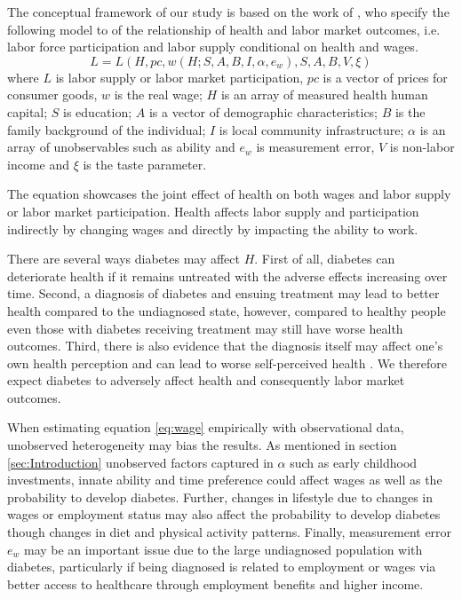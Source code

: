 \documentclass[12pt,english,british]{article}
\begin{document}
  
The conceptual framework of our study is based on the work of \citet{Strauss1998},  who specify the following model to of the relationship of health and labor market outcomes, i.e. labor force participation and labor supply conditional on health and wages.
\begin{equation}
L=L(H, pc, w(H;S,A,B,I,\alpha,e_{w}), S, A, B, V, \xi) \label{eq:wage}
\end{equation}
where $L$ is labor supply or labor market participation, $pc$ is a vector of prices for consumer goods, $w$ is the real wage; $H$ is an array of measured health human capital; $S$ is education; $A$ is a vector of demographic characteristics; $B$ is the family background of the individual; $I$ is local community infrastructure; $\alpha$ is an array of unobservables such as ability and $e_w$ is measurement error, $V$ is non-labor income and $\xi$ is the taste parameter. 

The equation showcases the joint effect of health on both wages and labor supply or labor market participation. Health affects labor supply and participation indirectly by changing wages and directly by impacting the ability to work.

There are several ways diabetes may affect $H$. First of all, diabetes can deteriorate health if it remains untreated with the adverse effects increasing over time. Second, a diagnosis of diabetes and ensuing treatment may lead to better health compared to the undiagnosed state, however, compared to healthy people even those with diabetes receiving treatment may still have worse health outcomes. Third, there is also evidence that the diagnosis itself may affect one's own health perception and can lead to worse self-perceived health \citep{Thoolen2006a}. We therefore expect diabetes to adversely affect health and consequently labor market outcomes.

When estimating equation  \ref{eq:wage} empirically with observational data, unobserved heterogeneity may bias the results. As mentioned in section  \ref{sec:Introduction} unobserved factors captured in $\alpha$ such as early childhood investments, innate ability and time preference could affect wages as well as the probability to develop diabetes. Further, changes in lifestyle due to changes in wages or employment status may also affect the probability to develop diabetes though changes in diet and physical activity patterns. Finally, measurement error $e_w$ may be an important issue due to the large undiagnosed population with diabetes, particularly if being diagnosed is related to employment or wages via better access to healthcare through employment benefits and higher income.
\end{document}
